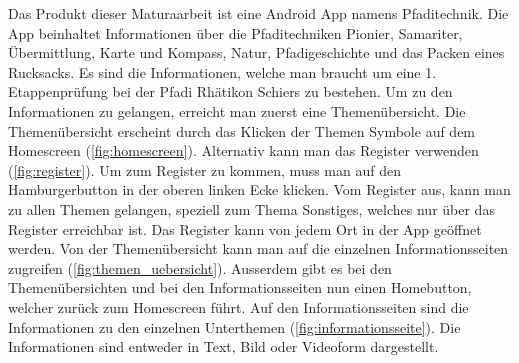 Das Produkt dieser Maturaarbeit ist eine Android App namens Pfaditechnik. Die App beinhaltet Informationen über die Pfaditechniken Pionier, Samariter, Übermittlung, Karte und Kompass, Natur, Pfadigeschichte und das Packen eines Rucksacks. Es sind die Informationen, welche man braucht um eine 1. Etappenprüfung bei der Pfadi Rhätikon Schiers zu bestehen. Um zu den Informationen zu gelangen, erreicht man zuerst eine Themenübersicht. Die Themenübersicht erscheint durch das Klicken der Themen Symbole auf dem Homescreen (\cref{fig:homescreen}). Alternativ kann man das Register verwenden (\cref{fig:register}). Um zum Register zu kommen, muss man auf den Hamburgerbutton in der oberen linken Ecke klicken. Vom Register aus, kann man zu allen Themen gelangen, speziell zum Thema Sonstiges, welches nur über das Register erreichbar ist. Das Register kann von jedem Ort in der App geöffnet werden. Von der Themenübersicht kann man auf die einzelnen Informationsseiten zugreifen (\cref{fig:themen_uebersicht}). Ausserdem gibt es bei den Themenübersichten und bei den Informationsseiten nun einen Homebutton, welcher zurück zum Homescreen führt. Auf den Informationsseiten sind die Informationen zu den einzelnen Unterthemen (\cref{fig:informationsseite}). Die Informationen sind entweder in Text, Bild oder Videoform dargestellt. 
